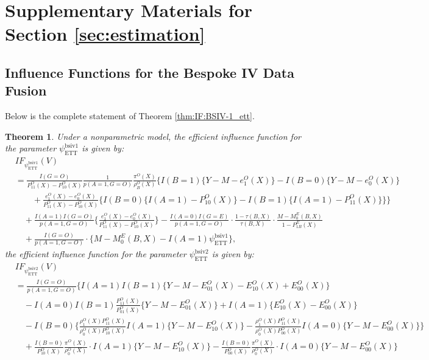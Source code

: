 \documentclass[10pt]{article}
\newtheorem{theorem}{Theorem}
\begin{document}
\section{Supplementary Materials for Section \ref{sec:estimation}}
\label{sec:estimation::supp}

\subsection{Influence Functions for the Bespoke IV Data Fusion}

Below is the complete statement of Theorem \ref{thm:IF:BSIV-1_ett}.

\begin{theorem}

Under a nonparametric model, the efficient influence function for the parameter $\psi^{\text{bsiv1}}_{\text{ETT}}$ is given by:
{\footnotesize
\begin{align*}
&IF_{\psi^{\text{bsiv1}}_{\text{ETT}}}(V)\\
&=\frac{I(G=O)}{P_{11}^O(X)-P_{10}^O(X)}\frac{1}{p(A=1,G=O)}\frac{\pi^O(X)}{\rho_B^O(X)}\bigg\{I(B=1)\{Y-M-e_1^O(X)\}-I(B=0)\{Y-M-e_0^O(X)\}\\
&\quad\quad+\frac{e_1^O(X)-e_0^O(X)}{P_{11}^O(X)-P_{10}^O(X)}\big\{I(B=0)\{I(A=1)-P_{10}^O(X)\}-I(B=1)\{I(A=1)-P_{11}^O(X)\}\big\}\bigg\}\\
&\quad+\frac{I(A=1)I(G=O)}{p(A=1,G=O)}\Big\{\frac{e_1^O(X)-e_0^O(X)}{P_{11}^O(X)-P_{10}^O(X)}\Big\}-\frac{I(A=0)I(G=E)}{p(A=1,G=O)}\cdot\frac{1-\tau(B,X)}{\tau(B,X)}\cdot
\frac{M-M_{0}^{E}(B,X)}{1-P_{1B}^E(X)}\\
&\quad+\frac{I(G=O)}{p(A=1,G=O)}\cdot \{M-M_{0}^{E}(B,X)-I(A=1)\psi^{\text{bsiv1}}_{\text{ETT}}\},
\end{align*}
}
the efficient influence function for the parameter $\psi^{\text{bsiv2}}_{\text{ETT}}$ is given by:
{\footnotesize
\begin{align*}
&IF_{\psi^{\text{bsiv2}}_{\text{ETT}}}(V)\\
&=\frac{I(G=O)}{p(A=1,G=O)}\Bigg\{I(A=1)I(B=1)\{Y-M-E_{01}^O(X)-E_{10}^O(X)+E_{00}^O(X)\}\\
&\quad-I(A=0)I(B=1)\frac{P_{11}^O(X)}{P_{01}^O(X)}\{Y-M-E_{01}^O(X)\}+I(A=1)\{E_{10}^O(X)-E_{00}^O(X)\}\\
&\quad-I(B=0)\Big\{\frac{\rho_{1}^O(X)P_{11}^O(X)}{\rho_{0}^O(X)P_{10}^O(X)}I(A=1)\{Y-M-E_{10}^O(X)\}-\frac{\rho_{1}^O(X)P_{11}^O(X)}{\rho_{0}^O(X)P_{00}^O(X)}I(A=0)\{Y-M-E_{00}^O(X)\}\Big\}\\
&\quad+\frac{I(B=0)}{P_{10}^O(X)}\frac{\pi^O(X)}{\rho_{0}^O(X)}\cdot I(A=1)\{Y-M-E_{10}^O(X)\}-\frac{I(B=0)}{P_{00}^O(X)}\frac{\pi^O(X)}{\rho_{0}^O(X)}\cdot I(A=0)\{Y-M-E_{00}^O(X)\}\\

\end{align*}}
\end{theorem}
\end{document}
